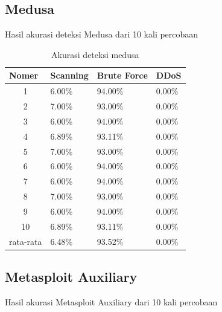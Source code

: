 \subsection{Medusa}
Hasil akurasi deteksi Medusa dari 10 kali percobaan
\begin{table}[H]
	\centering
	\caption{Akurasi deteksi medusa}
	\label{Akurasi deteksi medusa}
	\begin{tabular}{|c|l|l|l|}
		\hline
		\multicolumn{1}{|l|}{Nomer}     & Scanning & Brute Force & DDoS   \\ \hline
		1                               & 6.00\%   & 94.00\%     & 0.00\% \\ \hline
		2                               & 7.00\%   & 93.00\%     & 0.00\% \\ \hline
		3                               & 6.00\%   & 94.00\%     & 0.00\% \\ \hline
		4                               & 6.89\%   & 93.11\%     & 0.00\% \\ \hline
		5                               & 7.00\%   & 93.00\%     & 0.00\% \\ \hline
		6                               & 6.00\%   & 94.00\%     & 0.00\% \\ \hline
		7                               & 6.00\%   & 94.00\%     & 0.00\% \\ \hline
		8                               & 7.00\%   & 93.00\%     & 0.00\% \\ \hline
		9                               & 6.00\%   & 94.00\%     & 0.00\% \\ \hline
		10                              & 6.89\%   & 93.11\%     & 0.00\% \\ \hline
		\multicolumn{1}{|l|}{rata-rata} & 6.48\%   & 93.52\%     & 0.00\% \\ \hline
	\end{tabular}
\end{table}

\subsection{Metasploit Auxiliary}
Hasil akurasi Metasploit Auxiliary dari 10 kali percobaan

